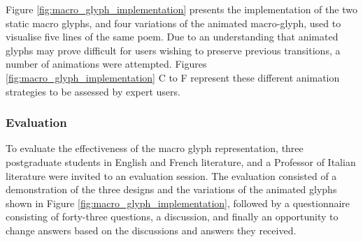Figure \ref{fig:macro_glyph_implementation} presents the implementation of the two static macro glyphs, and four variations of the animated macro-glyph, used to visualise five lines of the same poem. 
Due to an understanding that animated glyphs may prove difficult for users wishing to preserve previous transitions, a number of animations were attempted.
Figures \ref{fig:macro_glyph_implementation} C to F represent these different animation strategies to be assessed by expert users.

\subsubsection{Evaluation}

To evaluate the effectiveness of the macro glyph representation, three postgraduate students in English and French literature, and a Professor of Italian literature were invited to an evaluation session. 
The evaluation consisted of a demonstration of the three designs and the variations of the animated glyphs shown in Figure \ref{fig:macro_glyph_implementation}, followed by a questionnaire consisting of forty-three questions, a discussion, and finally an opportunity to change answers based on the discussions and answers they received.

